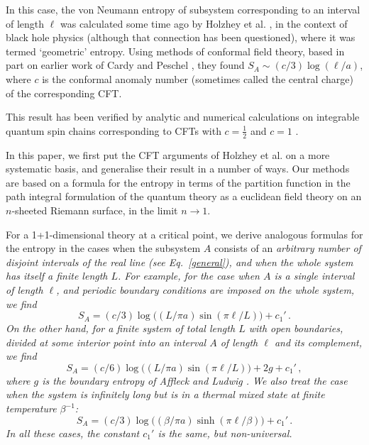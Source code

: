 \documentclass[12pt,aps,nofootinbib]{revtex4-1}
\begin{document}
In this case, the von Neumann entropy of subsystem corresponding to an
interval of length $\ell$ was calculated some time ago by Holzhey et
al. \cite{Holzhey},
in the context of black hole physics (although that connection
has been questioned), where it was termed `geometric' entropy. Using
methods of conformal field theory, based in part on earlier work of
Cardy and Peschel \cite{CardyPeschel}, they found
$S_A\sim (c/3)\log(\ell/a)$, where $c$ is the conformal anomaly number
(sometimes called the central charge) of the corresponding CFT.

This result has been verified by analytic and numerical calculations on
integrable quantum spin chains corresponding to CFTs with $c=\frac12$
and $c=1$ \cite{Vidal,Korepin,leb}.

In this paper, we first put the CFT arguments of Holzhey et al. \cite{Holzhey}
on a more
systematic basis, and generalise their result in a number of ways.
Our methods are based on a formula for the entropy in terms of the
partition function in the
path integral formulation of the quantum theory as a euclidean
field theory on an $n$-sheeted Riemann surface, in the limit $n\to1$.

For a 1+1-dimensional theory at a critical point, we derive analogous
formulas for the entropy in the cases when the subsystem $A$ consists
of an \em arbitrary \em number of disjoint intervals of the real line (see
Eq.~\ref{general}), and when the whole system has itself a finite length $L$.
For example, for the case when $A$ is a single interval of length
$\ell$, and periodic boundary conditions are imposed on the whole
system, we find
\begin{equation}
S_A=(c/3)\log\big((L/\pi a)\sin(\pi\ell/L)\big)+c_1'\,.
\end{equation}
On the other hand, for a finite system of total length $L$
with open boundaries, divided at some interior point into an interval
$A$ of length $\ell$ and its complement, we find
\begin{equation}
S_A=(c/6)\log\big((L/\pi a)\sin(\pi\ell/L)\big)+2g+c_1'\,,
\end{equation}
where $g$ is the boundary entropy of Affleck and
Ludwig \cite{AffleckLudwig}.
We also treat the case when the system is infinitely
long but is in a thermal mixed state at finite temperature $\beta^{-1}$:
\begin{equation}
\label{finiteT}
S_A=(c/3)\log\big((\beta/\pi a)\sinh(\pi\ell/\beta)\big)+c_1'\,.
\end{equation}
In all these cases, the constant $c_1'$ is the same, but
non-universal.
\end{document}
